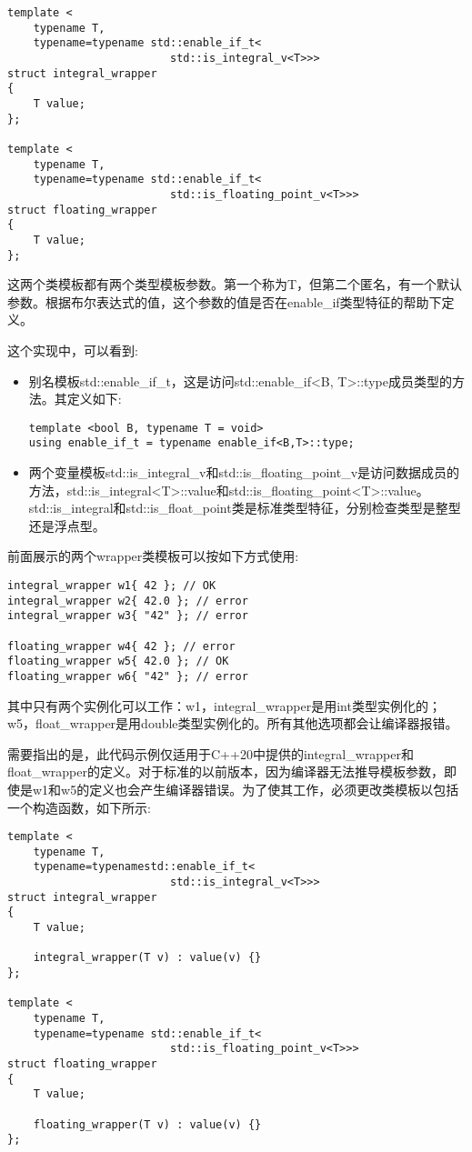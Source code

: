 \begin{lstlisting}[style=styleCXX]
template <
	typename T,
	typename=typename std::enable_if_t<
						 std::is_integral_v<T>>>
struct integral_wrapper
{
	T value;
};

template <
	typename T,
	typename=typename std::enable_if_t<
						 std::is_floating_point_v<T>>>
struct floating_wrapper
{
	T value;
};
\end{lstlisting}

这两个类模板都有两个类型模板参数。第一个称为T，但第二个匿名，有一个默认参数。根据布尔表达式的值，这个参数的值是否在enable\_if类型特征的帮助下定义。

这个实现中，可以看到:

\begin{itemize}
\item
别名模板std::enable\_if\_t，这是访问std::enable\_if<B, T>::type成员类型的方法。其定义如下:

\begin{lstlisting}[style=styleCXX]
template <bool B, typename T = void>
using enable_if_t = typename enable_if<B,T>::type;
\end{lstlisting}

\item
两个变量模板std::is\_integral\_v和std::is\_floating\_point\_v是访问数据成员的方法，std::is\_integral<T>::value和std::is\_floating\_point<T>::value。std::is\_integral和std::is\_float\_point类是标准类型特征，分别检查类型是整型还是浮点型。
\end{itemize}

前面展示的两个wrapper类模板可以按如下方式使用:

\begin{lstlisting}[style=styleCXX]
integral_wrapper w1{ 42 }; // OK
integral_wrapper w2{ 42.0 }; // error
integral_wrapper w3{ "42" }; // error

floating_wrapper w4{ 42 }; // error
floating_wrapper w5{ 42.0 }; // OK
floating_wrapper w6{ "42" }; // error
\end{lstlisting}

其中只有两个实例化可以工作：w1，integral\_wrapper是用int类型实例化的；w5，float\_wrapper是用double类型实例化的。所有其他选项都会让编译器报错。

需要指出的是，此代码示例仅适用于C++20中提供的integral\_wrapper和float\_wrapper的定义。对于标准的以前版本，因为编译器无法推导模板参数，即使是w1和w5的定义也会产生编译器错误。为了使其工作，必须更改类模板以包括一个构造函数，如下所示:

\begin{lstlisting}[style=styleCXX]
template <
	typename T,
	typename=typenamestd::enable_if_t<
						 std::is_integral_v<T>>>
struct integral_wrapper
{
	T value;

	integral_wrapper(T v) : value(v) {}
};

template <
	typename T,
	typename=typename std::enable_if_t<
						 std::is_floating_point_v<T>>>
struct floating_wrapper
{
	T value;

	floating_wrapper(T v) : value(v) {}
};
\end{lstlisting}

